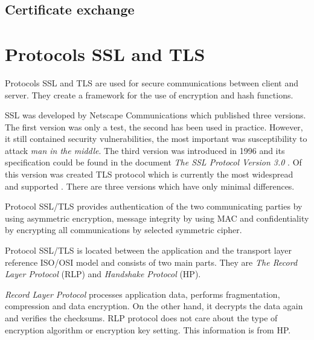 \documentclass[
  digital, %
  notable,   %
  lof,     %
  lot,     %
]{fithesis3}
\begin{document}
\subsection{Certificate exchange}


\section{Protocols SSL and TLS}
Protocols SSL and TLS are used for secure communications between client and server. They 
create a framework for the use of encryption and hash functions.

SSL was developed by Netscape Communications which published three versions. The first version 
was only a test, the second has been used in practice. However, it still contained security 
vulnerabilities, the most important was susceptibility to attack \textit{man in the middle}. %
The third version was introduced in 1996 and its specification could be found in the document 
\textit{The SSL Protocol Version 3.0} \cite{freier2011secure}. Of this version was created TLS 
protocol which is currently the most widespread and supported \cite{oppliger2003security}. 
There are three versions which have only minimal differences.

Protocol SSL/TLS provides authentication of the two communicating parties by using asymmetric 
encryption, message integrity by using MAC and confidentiality by encrypting all 
communications by selected symmetric cipher.

Protocol SSL/TLS is located between the application and the transport layer reference ISO/OSI 
model and consists of two main parts. They are \textit{The Record Layer Protocol} (RLP) and 
\textit{Handshake Protocol} (HP). %

\textit{Record Layer Protocol} processes application data, performs fragmentation, compression 
and data encryption. On the other hand, it decrypts the data again and verifies the checksums. 
RLP protocol does not care about the type of encryption algorithm or encryption key setting. 
This information is from HP.
\end{document}
